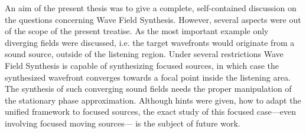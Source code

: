 \vspace{3mm}
An aim of the present thesis was to give a complete, self-contained discussion on the questions concerning Wave Field Synthesis.
However, several aspects were out of the scope of the present treatise.
As the most important example only diverging fields were discussed, i.e. the target wavefronts would originate from a sound source, outside of the listening region.
Under several restrictions Wave Field Synthesis is capable of synthesizing focused sources, in which case the synthesized wavefront converges towards a focal point inside the listening area.
The synthesis of such converging sound fields needs the proper manipulation of the stationary phase approximation.
Although hints were given, how to adapt the unified framework to focused sources, the exact study of this focused case---even involving focused moving sources--- is the subject of future work.